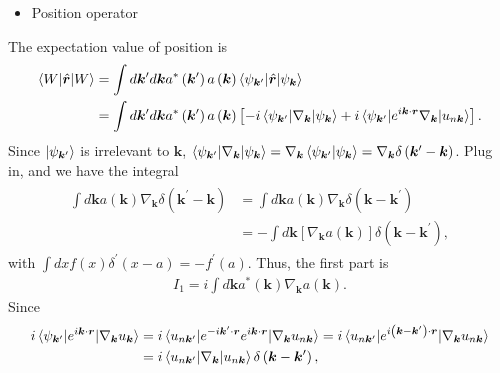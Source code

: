\documentclass[12pt, oneside]{article}
\newcommand{\pr}{\prime}
\newcommand{\p}[1]{\left(#1\right)}
\newcommand{\bb}[1]{\left[#1\right]}
\numberwithin{equation}{subsection}
\begin{document}
\begin{itemize}
	\item Position operator
\end{itemize}
The expectation value of position is 
\begin{align}
	\begin{split}
		\braket{{W| \hat{\bm{r}} } | W} &= \int d \bm{k}^\pr d \bm{k} a^{*} \p{\bm{k}^\pr} a \p{\bm{k}} \braket{\psi_{\bm{k}^\pr}| \hat{\bm{r}} | \psi_{\bm{k}}} \\
		&= \int d \bm{k}^\pr d \bm{k} a^{*} \p{\bm{k}^\pr} a \p{\bm{k}} \bb{-i \braket{\psi_{\bm{k}^\pr} | \nabla_{\bm{k}} | \psi_{\bm{k}} } + i \braket{\psi_{\bm{k}^\pr}|e^{i \bm{k} \cdot \bm{r}} \nabla_{\bm{k}} | u_{n \bm{k}}} }. \\
	\end{split}
\end{align} 
Since \(\ket{\psi_{\bm{k}^\pr}}\) is irrelevant to \(\bm{k}\), \(\braket{\psi_{\bm{k}^\pr} | \nabla_{\bm{k}} | \psi_{\bm{k}} } = \nabla_{\bm{k}} \braket{\psi_{\bm{k}^\pr} | \psi_{\bm{k}} } =  \nabla_{\bm{k}} \delta \p{\bm{k}^\pr - \bm{k}} \). Plug in, and we have the integral
\begin{align}
	\begin{split}
		\int d \bm{k} a \p{\bm{k}}  \nabla_{\bm{k}} \delta \p{\bm{k}^\pr - \bm{k}}  & =  \int d \bm{k} a \p{\bm{k}}  \nabla_{\bm{k}} \delta \p{\bm{k} - \bm{k}^\pr} \\
		& = - \int d \bm{k} \bb{\nabla_{\bm{k}} a \p{\bm{k}}} \delta \p{\bm{k}-\bm{k}^{\pr}},
	\end{split}
\end{align}
with \(\int dx f \p{x} \delta^\pr \p{x-a} = -f^\pr \p{a}\). Thus, the first part is 
\begin{align}
	I_1 = i \int d \bm{k} a^{*} \p{\bm{k}} \nabla_{\bm{k}} a \p{\bm{k}}.
\end{align}
Since
\begin{align}
	\begin{split}
		i \braket{\psi_{\bm{k}^\pr} | e^{i \bm{k} \cdot \bm{r}} | \nabla_{\bm{k}} u_{\bm{k}}} & = i \braket{ u_{n \bm{k}^\pr} | e^{ - i \bm{k}^{\pr} \cdot \bm{r}} e^{i \bm{k} \cdot \bm{r}} | \nabla_{\bm{k}} u_{n \bm{k}}}  =  i \braket{ u_{n \bm{k}^\pr} |  e^{i \p{\bm{k} - \bm{k}^\pr} \cdot \bm{r}} | \nabla_{\bm{k}} u_{n \bm{k}}} \\
		& = i \braket{ u_{n \bm{k}^\pr} | \nabla_{\bm{k}} |  u_{n \bm{k}}} \delta \p{\bm{k}-\bm{k}^\pr},
	\end{split}
\end{align}
\end{document}
